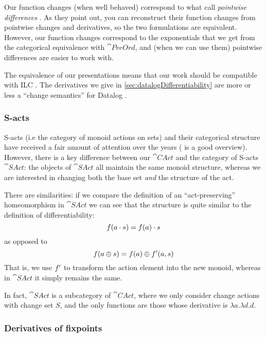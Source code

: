 Our function changes (when well behaved) correspond to what \citeauthor{cai2014changes} call
\emph{pointwise differences} \autocite[see][section 2.2]{cai2014changes}. As
they point out, you can reconstruct their
function changes from pointwise changes and derivatives, so the two formulations
are equivalent. However, our function changes correspond to the
exponentials that we get from the categorical equivalence with $\cat{PreOrd}$,
and (when we can use them) pointwise differences are easier to work with.

The equivalence of our presentations means that our work should be compatible
with ILC \autocite[see][section 3]{cai2014changes}. The derivatives we give in \cref{sec:datalogDifferentiability} are more or
less a ``change semantics'' for Datalog \autocite[see][section
3.5]{cai2014changes}. 

\subsubsection{S-acts}
\label{sec:sacts}

S-acts (i.e the category of monoid actions on sets) and their categorical structure have received a fair amount of attention
over the years (\textcite{kilp2000monoids} is a good
overview). However, there is a key difference between our $\cat{CAct}$ and the category of
S-acts $\cat{SAct}$: the objects of $\cat{SAct}$ all maintain the same monoid
structure, whereas we are interested in changing both the base set \emph{and} the structure of the act.

There are similarities: if we compare the definition of an ``act-preserving''
homeomorphism in $\cat{SAct}$ \autocite[see][]{kilp2000monoids} we can see that the structure is
quite similar to the definition of differentiability:
\begin{displaymath}
  f(a \cdot s) = f(a) \cdot s
\end{displaymath}
as opposed to
\begin{displaymath}
  f(a \oplus s) = f(a) \oplus f'(a, s)
\end{displaymath}
That is, we use $f'$ to transform the action element into the new
monoid, whereas in $\cat{SAct}$ it simply remains the same.

In fact, $\cat{SAct}$ is a subcategory of $\cat{CAct}$, where we only
consider change actions with change set $S$, and the only functions are those
whose derivative is $\lambda a. \lambda d. d$.

\subsubsection{Derivatives of fixpoints}

